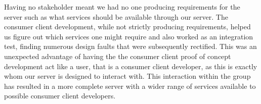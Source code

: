 Having no stakeholder meant we had no one producing requirements for the server such as what services should be available through our server.
The consumer client development, while not strictly producing requirements, helped us figure out which services one might require and also worked as an integration test, finding numerous design faults that were subsequently rectified.
This was an unexpected advantage of having the the consumer client proof of concept development act like a user, that is a consumer client developer, as this is exactly whom our server is designed to interact with.
This interaction within the group has resulted in a more complete server with a wider range of services available to possible consumer client developers.

